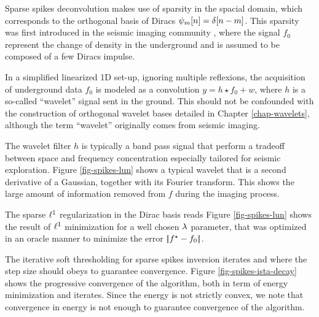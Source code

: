 Sparse spikes deconvolution makes use of sparsity in the spacial domain, which corresponds to the orthogonal basis of Diracs $\psi_m[n] = \delta[n-m]$. This sparsity was first introduced in the seismic imaging community \cite{}, where the signal $f_0$ represent the change of density in the underground and is assumed to be composed of a few Diracs impulse.

In a simplified linearized 1D set-up, ignoring multiple reflexions, the acquisition of underground data $f_0$ is modeled as a convolution $y=h \star f_0 + w$, where $h$ is a so-called ``wavelet'' signal sent in the ground. This should not be confounded with the construction of orthogonal wavelet bases detailed in Chapter \ref{chap-wavelets}, although the term ``wavelet'' originally comes from seismic imaging.

The wavelet filter $h$ is typically a band pass signal that perform a tradeoff between space and frequency concentration especially tailored for seismic exploration. Figure \eqref{fig-spikes-lun} shows a typical wavelet that is a second derivative of a Gaussian, together with its Fourier transform. This shows the large amount of information removed from $f$ during the imaging process.


The sparse $\ell^1$ regularization in the Dirac basis reads 
Figure \ref{fig-spikes-lun} shows the result of $\ell^1$ minimization for a well chosen $\lambda$ parameter, that was optimized in an oracle manner to minimize the error $|\!| f^\star-f_0 |\!|$.



The iterative soft thresholding for sparse spikes inversion iterates
and
where the step size should obeys 
to guarantee convergence. Figure \ref{fig-spikes-ista-decay} shows the progressive convergence of the algorithm, both in term of energy minimization and iterates. Since the energy is not strictly convex, we note that convergence in energy is not enough to guarantee convergence of the algorithm.


